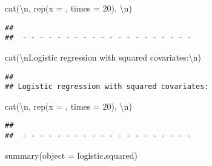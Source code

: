 \documentclass[
]{article}
\newenvironment{Shaded}{\begin{snugshade}}{\end{snugshade}}
\newcommand{\AttributeTok}[1]{\textcolor[rgb]{0.77,0.63,0.00}{#1}}
\newcommand{\DecValTok}[1]{\textcolor[rgb]{0.00,0.00,0.81}{#1}}
\newcommand{\FunctionTok}[1]{\textcolor[rgb]{0.00,0.00,0.00}{#1}}
\newcommand{\NormalTok}[1]{#1}
\newcommand{\SpecialCharTok}[1]{\textcolor[rgb]{0.00,0.00,0.00}{#1}}
\newcommand{\StringTok}[1]{\textcolor[rgb]{0.31,0.60,0.02}{#1}}
\begin{document}
\begin{Shaded}
\begin{Highlighting}[]
\FunctionTok{cat}\NormalTok{(}\StringTok{\textquotesingle{}}\SpecialCharTok{\textbackslash{}n}\StringTok{\textquotesingle{}}\NormalTok{, }\FunctionTok{rep}\NormalTok{(}\AttributeTok{x =} \StringTok{\textquotesingle{}{-}\textquotesingle{}}\NormalTok{, }\AttributeTok{times =} \DecValTok{20}\NormalTok{), }\StringTok{\textquotesingle{}}\SpecialCharTok{\textbackslash{}n}\StringTok{\textquotesingle{}}\NormalTok{)}
\end{Highlighting}
\end{Shaded}

\begin{verbatim}
## 
##  - - - - - - - - - - - - - - - - - - - -
\end{verbatim}

\begin{Shaded}
\begin{Highlighting}[]
\FunctionTok{cat}\NormalTok{(}\StringTok{\textquotesingle{}}\SpecialCharTok{\textbackslash{}n}\StringTok{Logistic regression with squared covariates:}\SpecialCharTok{\textbackslash{}n}\StringTok{\textquotesingle{}}\NormalTok{)}
\end{Highlighting}
\end{Shaded}

\begin{verbatim}
## 
## Logistic regression with squared covariates:
\end{verbatim}

\begin{Shaded}
\begin{Highlighting}[]
\FunctionTok{cat}\NormalTok{(}\StringTok{\textquotesingle{}}\SpecialCharTok{\textbackslash{}n}\StringTok{\textquotesingle{}}\NormalTok{, }\FunctionTok{rep}\NormalTok{(}\AttributeTok{x =} \StringTok{\textquotesingle{}{-}\textquotesingle{}}\NormalTok{, }\AttributeTok{times =} \DecValTok{20}\NormalTok{), }\StringTok{\textquotesingle{}}\SpecialCharTok{\textbackslash{}n}\StringTok{\textquotesingle{}}\NormalTok{)}
\end{Highlighting}
\end{Shaded}

\begin{verbatim}
## 
##  - - - - - - - - - - - - - - - - - - - -
\end{verbatim}

\begin{Shaded}
\begin{Highlighting}[]
\FunctionTok{summary}\NormalTok{(}\AttributeTok{object =}\NormalTok{ logistic.squared)}
\end{Highlighting}
\end{Shaded}
\end{document}
